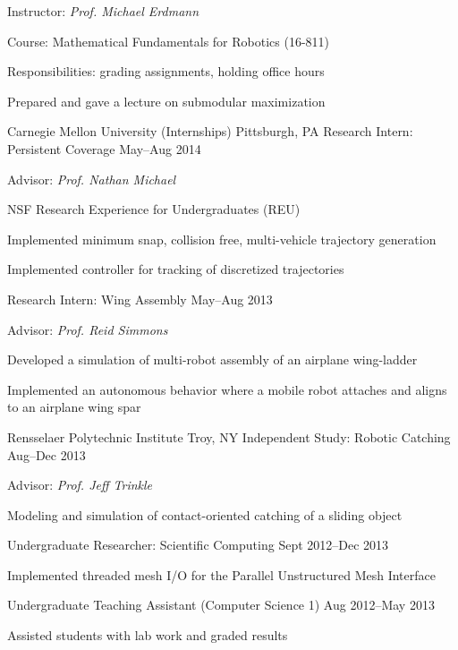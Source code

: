 \begin{cventries}
{\begin{cvitems}
    \item Instructor: \emph{Prof. Michael Erdmann}
    \item Course: Mathematical Fundamentals for Robotics (16-811)
    \item Responsibilities: grading assignments, holding office hours
    \item Prepared and gave a lecture on submodular maximization
    \end{cvitems}
  }
  \cventrytwo
  {Carnegie Mellon University (Internships)}
  {Pittsburgh, PA}
  {Research Intern: Persistent Coverage}
  {May--Aug 2014}
  {
    \begin{cvitems}
    \item Advisor: \emph{Prof. Nathan Michael}
    \item NSF Research Experience for Undergraduates (REU)
    \item Implemented minimum snap, collision free, multi-vehicle trajectory
      generation
    \item Implemented controller for tracking of discretized trajectories
    \end{cvitems}
  }
  {Research Intern: Wing Assembly}
  {May--Aug 2013}
  {
    \begin{cvitems}
    \item Advisor: \emph{Prof. Reid Simmons}
    \item Developed a simulation of multi-robot assembly of an airplane wing-ladder
    \item Implemented an autonomous behavior where a mobile robot attaches and
      aligns to an airplane wing spar
    \end{cvitems}
  }
  \cventrytwo
  {Rensselaer Polytechnic Institute}
  {Troy, NY}
  {Independent Study: Robotic Catching}
  {Aug--Dec 2013}
  {
    \begin{cvitems}
    \item Advisor: \emph{Prof. Jeff Trinkle}
    \item Modeling and simulation of contact-oriented catching of a sliding object
    \end{cvitems}
  }
  {Undergraduate Researcher: Scientific Computing}
  {Sept 2012--Dec 2013}
  {
    \begin{cvitems}
    \item Implemented threaded mesh I/O for the Parallel Unstructured Mesh Interface
    \end{cvitems}
  }
  \cventry
  {}
  {}
  {Undergraduate Teaching Assistant (Computer Science 1)}
  {Aug 2012--May 2013}
  {
    \begin{cvitems}
    \item Assisted students with lab work and graded results
    \end{cvitems}
  }
\end{cventries}
